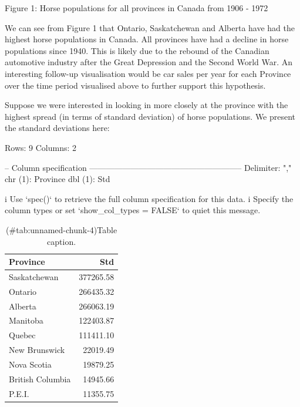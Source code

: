 \documentclass[
]{jss}
\begin{document}
Figure 1: Horse populations for all provinces in Canada from 1906 - 1972

We can see from Figure 1 that Ontario, Saskatchewan and Alberta have had the highest horse populations in Canada. All provinces have had a decline in horse populations since 1940. This is likely due to the rebound of the Canadian automotive industry after the Great Depression and the Second World War. An interesting follow-up visualisation would be car sales per year for each Province over the time period visualised above to further support this hypothesis.

Suppose we were interested in looking in more closely at the province with the highest spread (in terms of standard deviation) of horse populations. We present the standard deviations here:

\begin{CodeChunk}
\begin{CodeOutput}
Rows: 9 Columns: 2
\end{CodeOutput}
\begin{CodeOutput}
-- Column specification --------------------------------------------------------
Delimiter: ","
chr (1): Province
dbl (1): Std
\end{CodeOutput}
\begin{CodeOutput}

i Use `spec()` to retrieve the full column specification for this data.
i Specify the column types or set `show_col_types = FALSE` to quiet this message.
\end{CodeOutput}
\end{CodeChunk}

\begin{CodeChunk}
\begin{table}

\caption{(\#tab:unnamed-chunk-4)Table caption.}
\centering
\begin{tabular}[t]{l|r}
\hline
Province & Std\\
\hline
Saskatchewan & 377265.58\\
\hline
Ontario & 266435.32\\
\hline
Alberta & 266063.19\\
\hline
Manitoba & 122403.87\\
\hline
Quebec & 111411.10\\
\hline
New Brunswick & 22019.49\\
\hline
Nova Scotia & 19879.25\\
\hline
British Columbia & 14945.66\\
\hline
P.E.I. & 11355.75\\
\hline
\end{tabular}
\end{table}

\end{CodeChunk}
\end{document}
